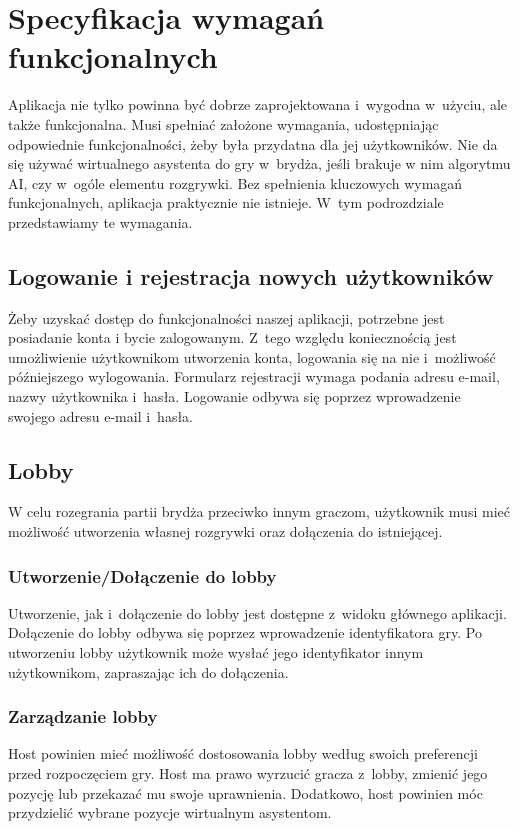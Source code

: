 

\section{Specyfikacja wymagań funkcjonalnych}

Aplikacja nie tylko powinna być dobrze zaprojektowana i~wygodna
w~użyciu, ale także funkcjonalna. Musi spełniać założone wymagania,
udostępniając odpowiednie funkcjonalności, żeby była przydatna dla
jej użytkowników. Nie da się używać wirtualnego asystenta do gry
w~brydża, jeśli brakuje w nim algorytmu AI, czy w~ogóle elementu
rozgrywki. Bez spełnienia kluczowych wymagań funkcjonalnych,
aplikacja praktycznie nie istnieje. W~tym podrozdziale przedstawiamy
te wymagania.


\subsection{Logowanie i rejestracja nowych użytkowników}
Żeby uzyskać dostęp do funkcjonalności naszej aplikacji, potrzebne
jest posiadanie konta i bycie zalogowanym. Z~tego względu koniecznością
jest umożliwienie użytkownikom utworzenia konta, logowania się na
nie i~możliwość późniejszego wylogowania. Formularz rejestracji wymaga
podania adresu e-mail, nazwy użytkownika i~hasła. Logowanie odbywa się
poprzez wprowadzenie swojego adresu e-mail i~hasła.


\subsection{Lobby}
W celu rozegrania partii brydża przeciwko innym graczom,
użytkownik musi mieć możliwość utworzenia własnej
rozgrywki oraz dołączenia do istniejącej.

\subsubsection{Utworzenie/Dołączenie do lobby}
Utworzenie, jak i~dołączenie do lobby jest dostępne z~widoku głównego aplikacji. Dołączenie do lobby
odbywa się poprzez wprowadzenie identyfikatora gry. Po utworzeniu lobby użytkownik może
wysłać jego identyfikator innym użytkownikom, zapraszając ich do dołączenia.

\subsubsection{Zarządzanie lobby}
Host powinien mieć możliwość dostosowania lobby według swoich preferencji przed
rozpoczęciem gry. Host ma prawo wyrzucić gracza z~lobby, zmienić jego pozycję lub przekazać
mu swoje uprawnienia. Dodatkowo, host powinien móc przydzielić wybrane pozycje
wirtualnym asystentom.



